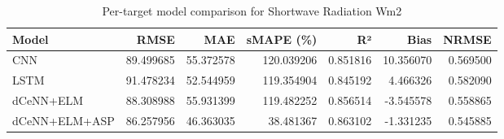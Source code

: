 \begin{table}
\caption{Per-target model comparison for Shortwave Radiation Wm2}
\begin{tabular}{lrrrrrr}
\toprule
Model & RMSE & MAE & sMAPE (\%) & R² & Bias & NRMSE \\
\midrule
CNN & 89.499685 & 55.372578 & 120.039206 & 0.851816 & 10.356070 & 0.569500 \\
LSTM & 91.478234 & 52.544959 & 119.354904 & 0.845192 & 4.466326 & 0.582090 \\
dCeNN+ELM & 88.308988 & 55.931399 & 119.482252 & 0.856514 & -3.545578 & 0.558865 \\
dCeNN+ELM+ASP & 86.257956 & 46.363035 & 38.481367 & 0.863102 & -1.331235 & 0.545885 \\
\bottomrule
\end{tabular}
\end{table}
